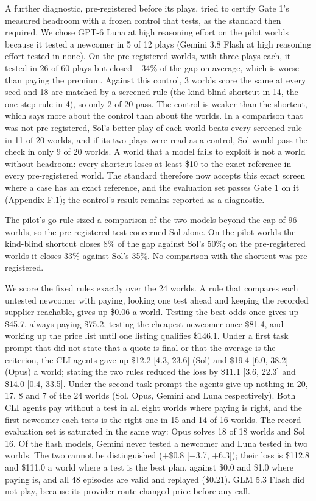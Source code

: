 A further diagnostic, pre-registered before its plays, tried to certify Gate 1's measured headroom with a frozen
control that tests, as the standard then required. We chose GPT-6 Luna at high reasoning effort on the pilot worlds
because it tested a newcomer in 5 of 12 plays (Gemini 3.8 Flash at high reasoning effort tested in none). On the
pre-registered worlds, with three plays each, it tested in 26 of 60 plays but closed −34\% of the gap on average,
which is worse than paying the premium. Against this control, 3 worlds score the same at every seed and 18 are
matched by a screened rule (the kind-blind shortcut in 14, the one-step rule in 4), so only 2 of 20 pass. The
control is weaker than the shortcut, which says more about the control than about the worlds. In a comparison that
was not pre-registered, Sol's better play of each world beats every screened rule in 11 of 20 worlds, and if its two
plays were read as a control, Sol would pass the check in only 9 of 20 worlds. A world that a model fails to exploit
is not a world without headroom: every shortcut loses at least \$10 to the exact reference in every pre-registered
world. The standard therefore now accepts this exact screen where a case has an exact reference, and the evaluation
set passes Gate 1 on it (Appendix F.1); the control's result remains reported as a diagnostic.

The pilot's go rule sized a comparison of the two models beyond the cap of 96 worlds, so the pre-registered test
concerned Sol alone. On the pilot worlds the kind-blind shortcut closes 8\% of the gap against Sol's 50\%; on the
pre-registered worlds it closes 33\% against Sol's 35\%. No comparison with the shortcut was pre-registered.

We score the fixed rules exactly over the 24 worlds. A rule that compares each untested newcomer with paying,
looking one test ahead and keeping the recorded supplier reachable, gives up \$0.06 a world. Testing the best odds
once gives up \$45.7, always paying \$75.2, testing the cheapest newcomer once \$81.4, and working up the price list
until one listing qualifies \$146.1. Under a first task prompt that did not state that a quote is final or that the
average is the criterion, the CLI agents gave up \$12.2 {[}4.3, 23.6{]} (Sol) and \$19.4 {[}6.0, 38.2{]} (Opus) a world;
stating the two rules reduced the loss by \$11.1 {[}3.6, 22.3{]} and \$14.0 {[}0.4, 33.5{]}. Under the second task prompt the
agents give up nothing in 20, 17, 8 and 7 of the 24 worlds (Sol, Opus, Gemini and Luna respectively). Both CLI agents
pay without a test in all eight worlds where paying is right, and the first newcomer each tests is the right one in
15 and 14 of 16 worlds. The record evaluation set is saturated in the same way: Opus solves 18 of 18 worlds and Sol
16. Of the flash models, Gemini never tested a newcomer and Luna tested in two worlds. The two cannot be
distinguished (+\$0.8 {[}−3.7, +6.3{]}); their loss is \$112.8 and \$111.0 a world where a test is the best plan, against
\$0.0 and \$1.0 where paying is, and all 48 episodes are valid and replayed (\$0.21). GLM 5.3 Flash did not play,
because its provider route changed price before any call.

